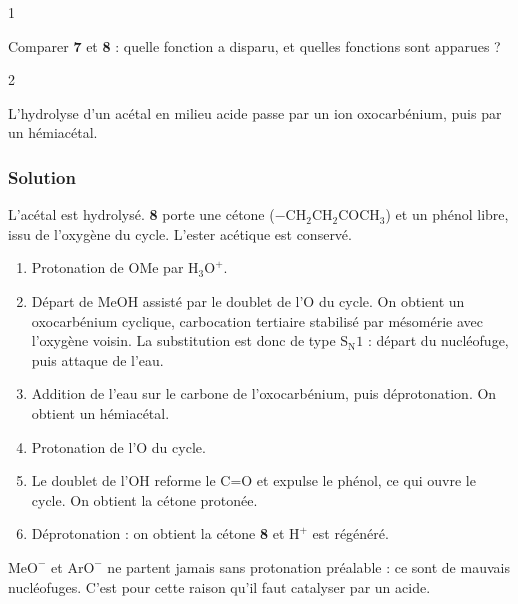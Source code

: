 \documentclass[11pt,a4paper]{article}
\providecommand{\tightlist}{\setlength{\itemsep}{0pt}\setlength{\parskip}{0pt}}
\begin{document}
\begin{indication}{1}

Comparer \textbf{7} et \textbf{8} : quelle fonction a disparu, et quelles fonctions sont apparues ?

\end{indication}

\begin{indication}{2}

L'hydrolyse d'un acétal en milieu acide passe par un ion oxocarbénium, puis par un hémiacétal.

\end{indication}

\hypertarget{solution-35}{%
\subsubsection{Solution}\label{solution-35}}

L'acétal est hydrolysé. \textbf{8} porte une cétone (\(\mathrm{{-}CH_2CH_2COCH_3}\)) et un phénol libre, issu de l'oxygène du cycle. L'ester acétique est conservé.

\begin{enumerate}
\def\labelenumi{\arabic{enumi}.}
\tightlist
\item
  Protonation de OMe par \(\mathrm{H_3O^+}\).
\item
  Départ de MeOH assisté par le doublet de l'O du cycle. On obtient un oxocarbénium cyclique, carbocation tertiaire stabilisé par mésomérie avec l'oxygène voisin. La substitution est donc de type \(\mathrm{S_N1}\) : départ du nucléofuge, puis attaque de l'eau.
\item
  Addition de l'eau sur le carbone de l'oxocarbénium, puis déprotonation. On obtient un hémiacétal.
\item
  Protonation de l'O du cycle.
\item
  Le doublet de l'OH reforme le C=O et expulse le phénol, ce qui ouvre le cycle. On obtient la cétone protonée.
\item
  Déprotonation : on obtient la cétone \textbf{8} et \(\mathrm{H^+}\) est régénéré.
\end{enumerate}

\begin{piege}

\(\mathrm{MeO^-}\) et \(\mathrm{ArO^-}\) ne partent jamais sans protonation préalable : ce sont de mauvais nucléofuges. C'est pour cette raison qu'il faut catalyser par un acide.

\end{piege}
\end{document}
